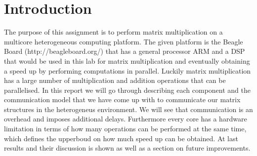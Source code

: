 \section{Introduction}

The purpose of this assignment is to perform matrix multiplication on a multicore heterogeneous computing platform. The given platform is the Beagle Board (http://beagleboard.org/) that has a general processor ARM and a DSP that would be used in this lab for matrix multiplication and eventually obtaining a speed up by performing computations in parallel. Luckily matrix multiplication has a large number of multiplication and addition operations that can be parallelised. In this report we will go through describing each component and the communication model that we have come up with to communicate our matrix structures in the heterogeneus environment. We will see that communication is an overhead and imposes additional delays. Furthermore every core has a hardware limitation in terms of how many operations can be performed at the same time, which defines the upperboud on how much speed up can be obtained. At last results and their discussion is shown as well as a section on future improvements.
